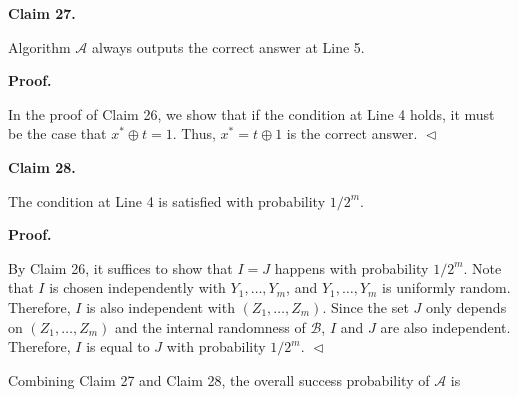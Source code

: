\documentclass[10pt,a4paper]{article}
\begin{document}


\par\medskip\noindent\textbf{
Claim 27. 
}\par



Algorithm $\mathcal{A}$ always outputs the correct answer at Line 5.\par







\par\medskip\noindent\textbf{
\textbf{Proof}.}\par




In the proof of Claim 26, we show that if the condition at Line 4 holds, it must be the case that $x^{*}\oplus t=1$. Thus, $x^{*}=t\oplus 1$ is the correct answer.
$\vartriangleleft$\par





\par\medskip\noindent\textbf{
Claim 28. 
}\par



The condition at Line 4 is satisfied with probability $1/2^{m}$.\par







\par\medskip\noindent\textbf{
\textbf{Proof}.}\par




By Claim 26, it suffices to show that $I=J$ happens with probability $1/2^{m}$.
Note that $I$ is chosen independently with $Y_{1},\ldots,Y_{m}$, and $Y_{1},\ldots,Y_{m}$ is uniformly random. Therefore, $I$ is also independent with $(Z_{1},\ldots,Z_{m})$.
Since the set $J$ only depends on $(Z_{1},\ldots,Z_{m})$ and the internal randomness of $\mathcal{B}$, $I$ and $J$ are also independent. Therefore, $I$ is equal to $J$ with probability $1/2^{m}$.
$\vartriangleleft$\par




Combining Claim 27 and Claim 28, the overall success probability of $\mathcal{A}$ is\par
\end{document}
